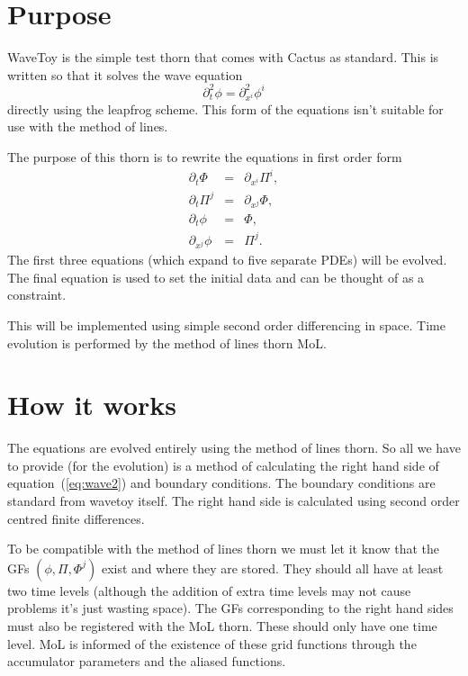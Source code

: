 
\section{Purpose}
\label{sec:purpose}

WaveToy is the simple test thorn that comes with Cactus as
standard. This is written so that it solves the wave equation
\begin{equation}
  \label{eq:wave1}
  \partial_t^2 \phi = \partial_{x^i}^2 \phi^i
\end{equation}
directly using the leapfrog scheme. This form of the equations isn't
suitable for use with the method of lines.

The purpose of this thorn is to rewrite the equations in first order
form
\begin{eqnarray}
  \label{eq:wave2}
  \partial_t \Phi & = & \partial_{x^i} \Pi^i, \\
  \partial_t \Pi^j & = & \partial_{x^j} \Phi, \\
  \partial_t \phi & = & \Phi, \\
  \partial_{x^j} \phi & = & \Pi^j.
\end{eqnarray}
The first three equations (which expand to five separate PDEs) will be
evolved. The final equation is used to set the initial data and can be
thought of as a constraint.

This will be implemented using simple second order differencing in
space. Time evolution is performed by the method of lines thorn MoL.

\section{How it works}
\label{sec:details}

The equations are evolved entirely using the method of lines thorn. So
all we have to provide (for the evolution) is a method of calculating
the right hand side of equation~(\ref{eq:wave2}) and boundary
conditions. The boundary conditions are standard from wavetoy
itself. The right hand side is calculated using second order centred
finite differences.

To be compatible with the method of lines thorn we must let it know
that the GFs $(\phi, \Pi, \Phi^j)$ exist and where they are stored.
They should all have at least two time levels (although the addition
of extra time levels may not cause problems it's just wasting space).
The GFs corresponding to the right hand sides must also be registered
with the MoL thorn. These should only have one time level. MoL is
informed of the existence of these grid functions through the
accumulator parameters and the aliased functions.

